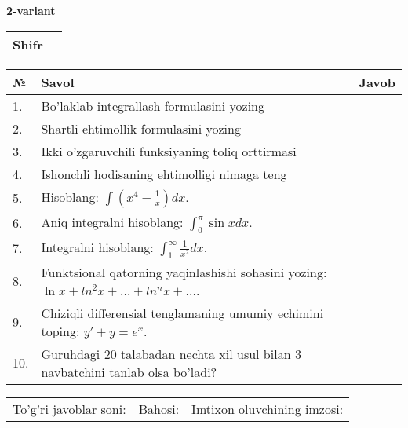 \documentclass{article}
\begin{document}
  \egroup
  
  \newpage
  
  
  \textbf{2-variant}\\
  
  \bgroup
  \def\arraystretch{1.6} %
  
  \begin{tabular}{|m{5.7cm}|m{9.5cm}|}
  \hline
  Shifr & \\
  \hline
  \end{tabular}
  
  \vspace{1cm}
  
  \begin{tabular}{|m{0.7cm}|m{10cm}|m{4cm}|}
  \hline
  № & Savol & Javob \\
  \hline
  1. & Bo'laklab integrallash formulasini yozing &  \\
  \hline
  2. & Shartli ehtimollik formulasini yozing &  \\
  \hline
  3. & Ikki o'zgaruvchili funksiyaning toliq orttirmasi &  \\
  \hline
  4. & Ishonchli hodisaning ehtimolligi nimaga teng &  \\
  \hline
  5. & Hisoblang: \(\int \left( x^{4} - \frac{1}{x} \right)dx\). &  \\
  \hline
  6. & Aniq integralni hisoblang: \(\int_{0}^{\pi}{\sin xdx}\). &  \\
  \hline
  7. & Integralni hisoblang: \(\int_{1}^{\infty}{\frac{1}{x^{2}}dx}\). &  \\
  \hline
  8. & Funktsional qatorning yaqinlashishi sohasini yozing: \(\ln x + ln^{2}x + ... + ln^{n}x + ...\). &  \\
  \hline
  9. & Chiziqli differensial tenglamaning umumiy echimini toping: \(y' + y = e^{x}\). &  \\
  \hline
  10. & Guruhdagi 20 talabadan nechta xil usul bilan 3 navbatchini tanlab olsa bo'ladi? &  \\
  \hline
  \end{tabular}
  
  \vspace{1cm}
  
  \begin{tabular}{lll}
  To'g'ri javoblar soni: \underline{\hspace{1.5cm}} & 
  Bahosi: \underline{\hspace{1.5cm}} & 
  Imtixon oluvchining imzosi: \underline{\hspace{2cm}} \\
  \end{tabular}
  
\end{document}
